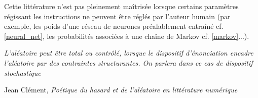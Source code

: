 \documentclass{article}
\newenvironment{citationbox}
{\begin{center}
		\begin{minipage}{.8\textwidth}
		}
		{
		\end{minipage}	
\end{center}
}
\begin{document}
			Cette littérature n'est pas pleinement maîtrisée lorsque certains paramètres régissant les instructions ne peuvent être réglés par l'auteur humain (par exemple, les poids d'une réseau de neurones préalablement entraîné cf. \ref{neural_net}, les probabilités associées à une chaîne de Markov cf. \ref{markov}...).\\
			\begin{citationbox}
				\textit{L'aléatoire peut être total ou contrôlé, lorsque le dispositif d'énonciation encadre l'aléatoire par des contraintes structurantes. On parlera dans ce cas de dispositif stochastique}
				\begin{flushright}
					Jean Clément, \textit{Poétique du hasard et de l'aléatoire en littérature numérique} \cite{clement2011}
				\end{flushright}
			\end{citationbox}
			
\end{document}
